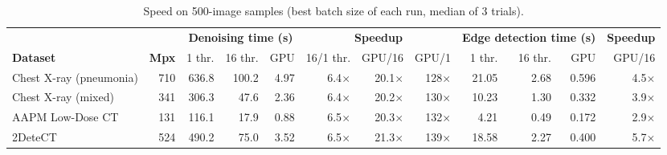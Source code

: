 \documentclass[10pt,a4paper]{article}
\begin{document}
\begin{table}[H]
	\centering\footnotesize
	\setlength{\tabcolsep}{5pt}
	\begin{tabular}{lrrrrrrrrrrr}
		\toprule
		& & \multicolumn{3}{c}{\textbf{Denoising time (s)}} & \multicolumn{3}{c}{\textbf{Speedup}} & \multicolumn{3}{c}{\textbf{Edge detection time (s)}} & \textbf{Speedup}\\
		\cmidrule(lr){3-5}\cmidrule(lr){6-8}\cmidrule(lr){9-11}
		\textbf{Dataset} & \textbf{Mpx} & 1 thr. & 16 thr. & GPU & 16/1 thr. & GPU/16 & GPU/1 & 1 thr. & 16 thr. & GPU & GPU/16\\
		\midrule
		Chest X-ray (pneumonia) & 710 & 636.8 & 100.2 & 4.97 & 6.4$\times$ & 20.1$\times$ & 128$\times$ & 21.05 & 2.68 & 0.596 & 4.5$\times$ \\
		Chest X-ray (mixed) & 341 & 306.3 & 47.6 & 2.36 & 6.4$\times$ & 20.2$\times$ & 130$\times$ & 10.23 & 1.30 & 0.332 & 3.9$\times$ \\
		AAPM Low-Dose CT & 131 & 116.1 & 17.9 & 0.88 & 6.5$\times$ & 20.3$\times$ & 132$\times$ & 4.21 & 0.49 & 0.172 & 2.9$\times$ \\
		2DeteCT & 524 & 490.2 & 75.0 & 3.52 & 6.5$\times$ & 21.3$\times$ & 139$\times$ & 18.58 & 2.27 & 0.400 & 5.7$\times$ \\
		\bottomrule
	\end{tabular}
	\caption{Speed on 500-image samples (best batch size of each run, median of 3 trials).}
	\label{tab:speed}
\end{table}
\end{document}
